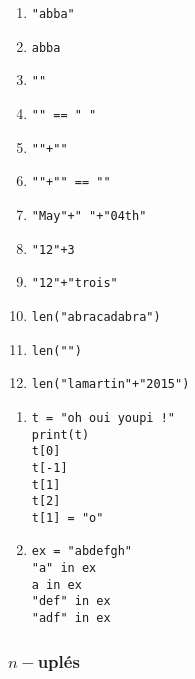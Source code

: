 \begin{multicols}{2}
  \begin{enumerate}[label=\emph{\alph*)}]
    \item \texttt{"abba"}
    \item \texttt{abba}
    \item \texttt{""}
    \item \texttt{"" == " "}
    \item \texttt{""+""}
    \item \texttt{""+"" == ""}
    \item \texttt{"May"+" "+"04th"}
    \item \texttt{"12"+3}
    \item \texttt{"12"+"trois"}
    \item \texttt{len("abracadabra")}
    \item \texttt{len("")}
    \item \texttt{len("lamartin"+"2015")}
  \end{enumerate}



\begin{enumerate}[label=\emph{\alph*)}]
\item 
\begin{lstlisting}
t = "oh oui youpi !"
print(t)
t[0]
t[-1]
t[1]
t[2]
t[1] = "o" 
\end{lstlisting}
\end{enumerate}

\begin{enumerate}[label=\emph{\alph*)}]
\setcounter{enumi}{1}
\item
\begin{lstlisting}
ex = "abdefgh"
"a" in ex
a in ex
"def" in ex
"adf" in ex
\end{lstlisting}
\end{enumerate}


\subsubsection*{$n-$uplés}



\end{multicols}
